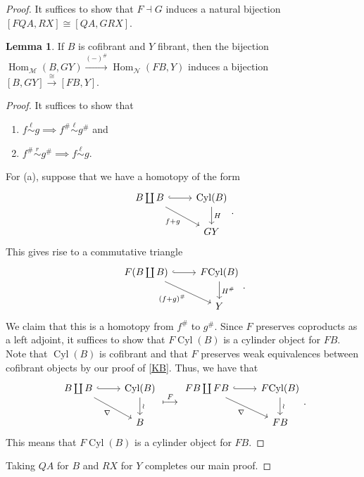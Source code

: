 \documentclass[10pt,letterpaper,cm]{nupset}
\theoremstyle{definition}
\theoremstyle{theorem}
\newtheorem{lemma}[defn]{Lemma}
\theoremstyle{remark}
\newcommand{\1}{\mathbb{1}}
\newcommand{\n}{\mathcal{N}}
\newcommand{\m}{\mathcal{M}}
\newcommand{\0}{\vec 0}
\DeclareMathOperator{\Hom}{Hom}
\DeclareMathOperator{\cyl}{Cyl}
\newcommand{\be}{\begin{enumerate}}
\newcommand{\ee}{\end{enumerate}}
\begin{document}
\begin{proof}
It suffices to show that $F \dashv G$ induces a natural bijection $\left[F{Q{A}}, R{X}\right] \cong \left[Q{A}, G{R{X}}\right]$. 
\begin{lemma}\label{cof-fib}
If $B$ is cofibrant and $Y$ fibrant, then the bijection $\Hom_{\m}(B, G{Y}) \xrightarrow{\left({-}\right)^{\#}} \Hom_{\n}(F{B}, Y)$ induces a bijection $\left[B, G{Y}\right] \xrightarrow{\cong} \left[F{B}, Y\right]$.
\end{lemma}
\begin{proof}
It suffices to show that
\be[label=(\alph*)]
\item $f \overset{\ell}{\sim} g \implies f^{\#} \overset{\ell}{\sim} g^{\#}$ and
\item $f^{\#} \overset{r}{\sim} g^{\#} \implies f \overset{\ell}{\sim} g$.
\ee
For (a), suppose that we have a homotopy of the form
\[
\begin{tikzcd}
	{B \coprod B} & {\cyl(B)} \\
	& {G{Y}}
	\arrow["{f+g}"', from=1-1, to=2-2]
	\arrow["H", from=1-2, to=2-2]
	\arrow[hook, from=1-1, to=1-2]
\end{tikzcd}
.\] This gives rise to a commutative triangle
\[
\begin{tikzcd}
	{F(B \coprod B)} & {F{\cyl(B)}} \\
	& Y
	\arrow["{\left(f+g\right)^{\#}}"', from=1-1, to=2-2]
	\arrow["{H^{\#}}", from=1-2, to=2-2]
	\arrow[hook, from=1-1, to=1-2]
\end{tikzcd}
.\] We claim that this is a homotopy from $f^{\#}$ to $g^{\#}$. Since $F$ preserves coproducts as a left adjoint, it suffices to show that $F{\cyl(B)}$ is a cylinder object for $F{B}$. Note that $\cyl(B)$ is cofibrant and that $F$ preserves weak equivalences between cofibrant objects by our proof of \cref{KB}. Thus, we have that
\[
\begin{tikzcd}
	{B\coprod B} & {\cyl(B)} \\
	& B
	\arrow["\nabla"', from=1-1, to=2-2]
	\arrow["\wr", from=1-2, to=2-2]
	\arrow[hook, from=1-1, to=1-2]
\end{tikzcd} 
\overset{F}{\longmapsto}
\begin{tikzcd}
	{F{B}\coprod F{B}} & {F{\cyl(B)}} \\
	& {F{B}}
	\arrow["\nabla"', from=1-1, to=2-2]
	\arrow["\wr", from=1-2, to=2-2]
	\arrow[hook, from=1-1, to=1-2]
\end{tikzcd}
.\] This means that $F{\cyl(B)}$ is a cylinder object for $F{B}$.
\end{proof} 
Taking $Q{A}$ for $B$ and $R{X}$ for $Y$ completes our main proof.
\end{proof}
\end{document}

